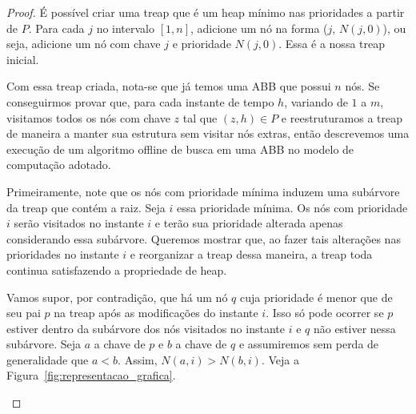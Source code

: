 \begin{proof}
É possível criar uma treap que é um heap mínimo nas prioridades a partir de $P$. Para cada $j$ no intervalo $[1,n]$, adicione um nó na forma ($j$, $N(j,0)$), ou seja, adicione um nó com chave $j$ e prioridade $N(j,0)$. Essa é a nossa treap inicial.

Com essa treap criada, nota-se que já temos uma ABB que possui $n$ nós. Se conseguirmos provar que, para cada instante de tempo $h$, variando de $1$ a $m$, visitamos todos os nós com chave $z$ tal que $(z,h) \in P$ e reestruturamos a treap de maneira a manter sua estrutura sem visitar nós extras, então descrevemos uma execução de um algoritmo offline de busca em uma ABB no modelo de computação adotado.

Primeiramente, note que os nós com prioridade mínima induzem uma subárvore da treap que contém a raiz.
Seja $i$ essa prioridade mínima. Os nós com prioridade $i$ serão visitados no instante $i$ e terão sua prioridade alterada apenas considerando essa subárvore. Queremos mostrar que, ao fazer tais alterações nas prioridades no instante $i$ e reorganizar a treap dessa maneira, a treap toda continua satisfazendo a propriedade de heap.

Vamos supor, por contradição, que há um nó $q$ cuja prioridade é menor que de seu pai $p$ na treap após as modificações do instante $i$. Isso só pode ocorrer se $p$ estiver dentro da subárvore dos nós visitados no instante $i$ e $q$ não estiver nessa subárvore. Seja $a$ a chave de $p$ e $b$ a chave de $q$ e assumiremos sem perda de generalidade que $a < b$. Assim, $N(a,i) > N(b,i)$. Veja a Figura~\ref{fig:representacao_grafica}.


\begin{figure}[H]
\end{figure}
\end{proof}
